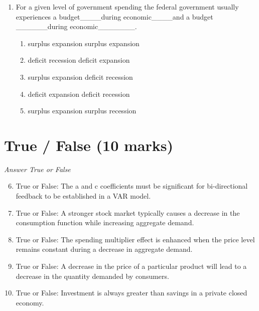 \documentclass[12pt]{article}
\begin{document}
\begin{enumerate}[label=\arabic*.]
\begin{enumerate}[label=(\alph*)]
    \item Average total cost = total fixed costs plus total variable costs.
    \item Average total cost = total costs divided by the marginal cost of production.
    \item Average total cost = total variable costs divided by the number of units produced.
    \item Average total cost = total fixed costs divided by the number of units produced.
    \item Average total cost = average variable cost plus marginal cost.
\end{enumerate}
\item For a given level of government spending the federal government usually experiences a budget\_\_\_\_during economic\_\_\_\_and a budget \_\_\_\_\_\_during economic\_\_\_\_\_\_\_.
\begin{enumerate}[label=(\alph*)]
    \item surplus expansion surplus expansion
    \item deficit recession deficit expansion
    \item surplus expansion deficit recession
    \item deficit expansion deficit recession
    \item surplus expansion surplus recession
\end{enumerate}
\end{enumerate}

\section*{True / False (10 marks)}
\textit{Answer True or False}
\begin{enumerate}[label=\arabic*.]
\setcounter{enumi}{5}
\item True or False: The a and c coefficients must be significant for bi-directional feedback to be established in a VAR model.
\item True or False: A stronger stock market typically causes a decrease in the consumption function while increasing aggregate demand.
\item True or False: The spending multiplier effect is enhanced when the price level remains constant during a decrease in aggregate demand.
\item True or False: A decrease in the price of a particular product will lead to a decrease in the quantity demanded by consumers.
\item True or False: Investment is always greater than savings in a private closed economy.
\end{enumerate}
\end{document}
